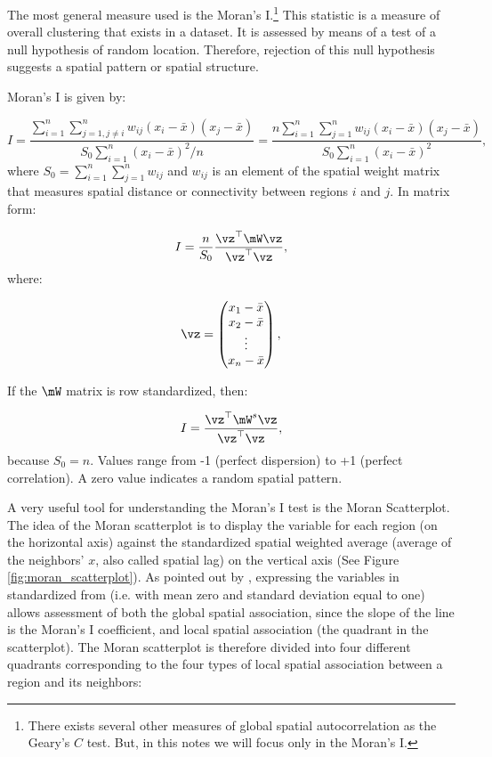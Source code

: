 The most general measure used is the Moran's I.\footnote{There exists several other measures of global spatial autocorrelation as the Geary's $C$ test. But, in this notes we will focus only in the Moran's I.} This statistic is a measure of overall clustering that exists in a dataset. It is assessed by means of a test of a null hypothesis of random location. Therefore, rejection of this null hypothesis suggests a spatial pattern or spatial structure. 

Moran's I is given by:

\begin{equation}\label{eq:I-moran}
I = \frac{\sum_{i = 1}^n\sum_{j=1, j\neq i}^n w_{ij}\left(x_i - \bar{x}\right)\left(x_j - \bar{x}\right)}{S_0 \sum_{i = 1}^n\left(x_i - \bar{x}\right)^2/n} = \frac{n\sum_{i = 1}^n\sum_{j=1}^n w_{ij}\left(x_i - \bar{x}\right)\left(x_j - \bar{x}\right)}{S_0 \sum_{i = 1}^n\left(x_i - \bar{x}\right)^2},
\end{equation}
%
where $S_0=\sum_{i = 1}^n\sum_{j=1}^nw_{ij}$ and $w_{ij}$ is an element of the spatial weight matrix that measures spatial distance or connectivity between regions $i$ and $j$. In matrix form:

\begin{equation*}
	I = \frac{n}{S_0} \frac{\vz^\top\mW\vz}{\vz^\top\vz},
\end{equation*}
%
where: 

\begin{equation*}
\vz = \begin{pmatrix}
          x_1 - \bar{x}\\
          x_2 - \bar{x} \\
          \vdots\\
          x_n - \bar{x}
      \end{pmatrix},
\end{equation*}

If the $\mW$ matrix is row standardized, then:

\begin{equation*}
	I = \frac{\vz^\top\mW^s\vz}{\vz^\top\vz},
\end{equation*}
%
because $S_0=n$. Values range from -1 (perfect dispersion) to +1 (perfect correlation). A zero value indicates a random spatial pattern. 

A very useful tool for understanding the Moran’s I test is the Moran Scatterplot. The idea of the Moran scatterplot is to display the variable for each region (on the horizontal axis) against the standardized spatial weighted average (average of the neighbors' $x$, also called spatial lag) on the vertical axis (See Figure \ref{fig:moran_scatterplot}). As pointed out by \cite{anselin1996chapter}, expressing the variables in standardized from (i.e. with mean zero and standard deviation equal to one) allows assessment of both the global spatial association, since the slope of the line is the Moran's I coefficient, and local spatial association (the quadrant in the scatterplot). The Moran scatterplot is therefore divided into four different quadrants corresponding to the four types of local spatial association between a region and its neighbors:

